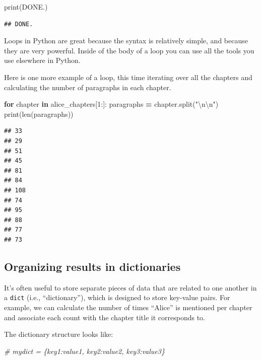 \documentclass[
]{book}
\newenvironment{Shaded}{\begin{snugshade}}{\end{snugshade}}
\newcommand{\BuiltInTok}[1]{#1}
\newcommand{\CharTok}[1]{\textcolor[rgb]{0.31,0.60,0.02}{#1}}
\newcommand{\CommentTok}[1]{\textcolor[rgb]{0.56,0.35,0.01}{\textit{#1}}}
\newcommand{\ControlFlowTok}[1]{\textcolor[rgb]{0.13,0.29,0.53}{\textbf{#1}}}
\newcommand{\DecValTok}[1]{\textcolor[rgb]{0.00,0.00,0.81}{#1}}
\newcommand{\KeywordTok}[1]{\textcolor[rgb]{0.13,0.29,0.53}{\textbf{#1}}}
\newcommand{\NormalTok}[1]{#1}
\newcommand{\OperatorTok}[1]{\textcolor[rgb]{0.81,0.36,0.00}{\textbf{#1}}}
\newcommand{\StringTok}[1]{\textcolor[rgb]{0.31,0.60,0.02}{#1}}
\begin{document}
\begin{Shaded}
\begin{Highlighting}[]
\BuiltInTok{print}\NormalTok{(}\StringTok{\textquotesingle{}DONE.\textquotesingle{}}\NormalTok{)}
\end{Highlighting}
\end{Shaded}

\begin{verbatim}
## DONE.
\end{verbatim}

Loops in Python are great because the syntax is relatively simple, and because they are very powerful. Inside of the body of a loop you can use all the tools you use elsewhere in Python.

Here is one more example of a loop, this time iterating over all the chapters and calculating the number of paragraphs in each chapter.

\begin{Shaded}
\begin{Highlighting}[]
\ControlFlowTok{for}\NormalTok{ chapter }\KeywordTok{in}\NormalTok{ alice\_chapters[}\DecValTok{1}\NormalTok{:]:}
\NormalTok{    paragraphs }\OperatorTok{=}\NormalTok{ chapter.split(}\StringTok{"}\CharTok{\textbackslash{}n\textbackslash{}n}\StringTok{"}\NormalTok{)}
    \BuiltInTok{print}\NormalTok{(}\BuiltInTok{len}\NormalTok{(paragraphs))}
\end{Highlighting}
\end{Shaded}

\begin{verbatim}
## 33
## 29
## 51
## 45
## 81
## 84
## 108
## 74
## 95
## 88
## 77
## 73
\end{verbatim}

\hypertarget{organizing-results-in-dictionaries}{%
\subsection{Organizing results in dictionaries}\label{organizing-results-in-dictionaries}}

It's often useful to store separate pieces of data that are related to one another in a \texttt{dict} (i.e., ``dictionary''), which is designed to store key-value pairs. For example, we can calculate the number of times ``Alice'' is mentioned per chapter and associate each count with the chapter title it corresponds to.

The dictionary structure looks like:

\begin{Shaded}
\begin{Highlighting}[]
\CommentTok{\# mydict = \{key1:value1, key2:value2, key3:value3\}}
\end{Highlighting}
\end{Shaded}
\end{document}
